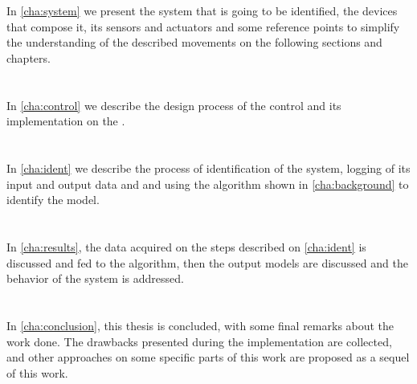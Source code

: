 \paragraph{} ~\\
In \autoref{cha:system} we present the system that is going to be identified,
the devices that compose it, its sensors and actuators and some reference points to simplify the understanding
of the described movements on the following sections and chapters.


\paragraph{} ~\\
In \autoref{cha:control} we describe the design process of the control and its
implementation on the \PLCs.

\paragraph{} ~\\
In \autoref{cha:ident} we describe the process of identification of the system,
logging of its input and output data and
and using the algorithm shown in
\autoref{cha:background} to identify the model.

\paragraph{} ~\\
In \autoref{cha:results}, the data acquired on the steps described on
\autoref{cha:ident} is discussed and fed to the algorithm, then the
output models are discussed and the behavior of the system is addressed.


\paragraph{} ~\\
In \autoref{cha:conclusion}, this thesis is concluded, with some final remarks
about the work done. The drawbacks presented during the implementation are
collected, and other approaches on some specific parts of this work are proposed
as a sequel of this work.


